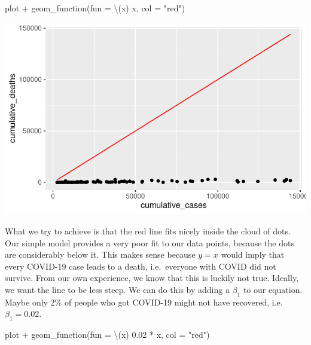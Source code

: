 \documentclass[
  letterpaper,
]{krantz}
\makeatletter
\newenvironment{Shaded}{\begin{snugshade}}{\end{snugshade}}
\newcommand{\AttributeTok}[1]{\textcolor[rgb]{0.40,0.45,0.13}{#1}}
\newcommand{\FloatTok}[1]{\textcolor[rgb]{0.68,0.00,0.00}{#1}}
\newcommand{\FunctionTok}[1]{\textcolor[rgb]{0.28,0.35,0.67}{#1}}
\newcommand{\NormalTok}[1]{\textcolor[rgb]{0.00,0.23,0.31}{#1}}
\newcommand{\SpecialCharTok}[1]{\textcolor[rgb]{0.37,0.37,0.37}{#1}}
\newcommand{\StringTok}[1]{\textcolor[rgb]{0.13,0.47,0.30}{#1}}
\newenvironment{kframe}{%
\medskip{}
\setlength{\fboxsep}{.8em}
 \def\at@end@of@kframe{}%
 \ifinner\ifhmode%
  \def\at@end@of@kframe{\end{minipage}}%
  \begin{minipage}{\columnwidth}%
 \fi\fi%
 \def\FrameCommand##1{\hskip\@totalleftmargin \hskip-\fboxsep
 \colorbox{shadecolor}{##1}\hskip-\fboxsep
     \hskip-\linewidth \hskip-\@totalleftmargin \hskip\columnwidth}%
 \MakeFramed {\advance\hsize-\width
   \@totalleftmargin\z@ \linewidth\hsize
   \@setminipage}}%
 {\par\unskip\endMakeFramed%
 \at@end@of@kframe}
\renewenvironment{Shaded}{\begin{kframe}}{\end{kframe}}
\makeatother
\begin{document}
\begin{Shaded}
\begin{Highlighting}[]
\NormalTok{plot }\SpecialCharTok{+}
  \FunctionTok{geom\_function}\NormalTok{(}\AttributeTok{fun =}\NormalTok{ \textbackslash{}(x) x, }\AttributeTok{col =} \StringTok{"red"}\NormalTok{)}
\end{Highlighting}
\end{Shaded}

\includegraphics{13_regressions_files/figure-latex/fitting-model-by-hand-step-four-1.pdf}

What we try to achieve is that the red line fits nicely inside the cloud
of dots. Our simple model provides a very poor fit to our data points,
because the dots are considerably below it. This makes sense because
\(y = x\) would imply that every COVID-19 case leads to a death,
i.e.~everyone with COVID did not survive. From our own experience, we
know that this is luckily not true. Ideally, we want the line to be less
steep. We can do this by adding a \(\beta_1\) to our equation. Maybe
only 2\% of people who got COVID-19 might not have recovered,
i.e.~\(\beta_1 = 0.02\).

\begin{Shaded}
\begin{Highlighting}[]
\NormalTok{plot }\SpecialCharTok{+}
  \FunctionTok{geom\_function}\NormalTok{(}\AttributeTok{fun =}\NormalTok{ \textbackslash{}(x) }\FloatTok{0.02} \SpecialCharTok{*}\NormalTok{ x, }\AttributeTok{col =} \StringTok{"red"}\NormalTok{)}
\end{Highlighting}
\end{Shaded}
\end{document}
